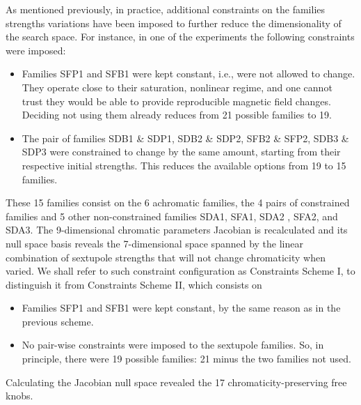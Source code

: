 As mentioned previously, in practice, additional constraints on the families strengths variations  have been imposed to further reduce the dimensionality of the search space. For instance, in one of the experiments the following constraints were imposed:
\begin{itemize}
    \item Families SFP1 and SFB1 were kept constant, i.e., were not allowed to change. They operate close to their saturation, nonlinear regime, and one cannot trust they would be able to provide reproducible magnetic field changes. Deciding not using them already reduces from 21 possible families to 19.
    \item The pair of families SDB1 \& SDP1, SDB2 \& SDP2, SFB2 \& SFP2, SDB3 \& SDP3 were constrained to change by the same amount, starting from their respective initial strengths. This reduces the available options from 19 to 15 families.
\end{itemize}
These 15 families consist on the 6 achromatic families, the 4 pairs of constrained families and 5 other non-constrained families SDA1, SFA1, SDA2 , SFA2, and SDA3. The 9-dimensional chromatic parameters Jacobian is recalculated and its null space basis reveals the 7-dimensional space spanned by the linear combination of sextupole strengths that will not change chromaticity when varied. We shall refer to such constraint configuration as Constraints Scheme I, to distinguish it from Constraints Scheme II, which consists on
\begin{itemize}
    \item Families SFP1 and SFB1 were kept constant, by the same reason as in the previous scheme.
    \item No pair-wise constraints were imposed to the sextupole families. So, in principle, there were 19 possible families: 21 minus the two families not used.
\end{itemize}
Calculating the Jacobian null space revealed the 17 chromaticity-preserving free knobs.

